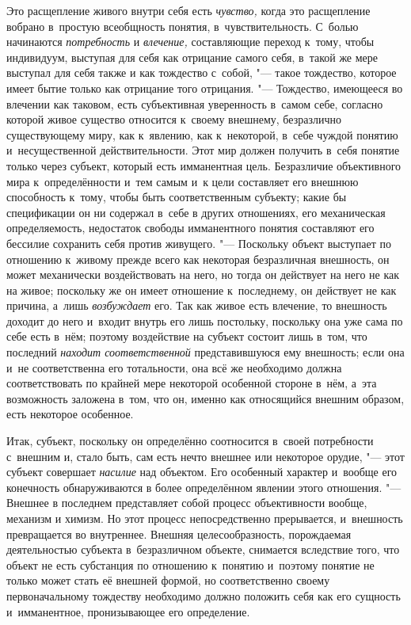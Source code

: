 Это расщепление живого внутри себя есть
{\em чувство,} когда это
расщепление вобрано в~простую всеобщность понятия, в~чувствительность.
С~болью начинаются {\em потребность}
и {\em влечение,}
составляющие переход к~тому, чтобы индивидуум, выступая для
себя как отрицание самого себя, в~такой же мере выступал для себя также и
как тождество с~собой, "--- такое тождество, которое имеет
бытие только как отрицание того отрицания. "--- Тождество,
имеющееся во влечении как таковом, есть субъективная уверенность в~самом
себе, согласно которой живое существо относится к~своему внешнему,
безразлично существующему миру, как к~явлению, как к~некоторой, в~себе
чуждой понятию и~несущественной действительности. Этот мир
должен получить в~себя понятие только через субъект, который
есть имманентная цель. Безразличие объективного мира к~определённости и~тем
самым и~к цели составляет его внешнюю способность к~тому, чтобы быть
соответственным субъекту; какие бы спецификации он ни содержал в~себе в
других отношениях, его механическая определяемость, недостаток свободы
имманентного понятия составляют его бессилие сохранить себя против
живущего. "--- Поскольку объект выступает по отношению к~живому
прежде всего как некоторая безразличная внешность, он может механически
воздействовать на него, но тогда он действует на него не как на живое;
поскольку же он имеет отношение к~последнему, он действует не как причина,
а~лишь {\em возбуждает}
его. Так как живое есть влечение, то внешность доходит до
него и~входит внутрь его лишь постольку, поскольку она уже сама по себе
есть в~нём; поэтому воздействие на субъект состоит лишь в~том, что
последний {\em находит соответственной}
представившуюся ему внешность; если она и~не соответственна
его тотальности, она всё же необходимо должна соответствовать по крайней
мере некоторой особенной стороне в~нём, а~эта возможность заложена в~том,
что он, именно как относящийся внешним образом, есть некоторое особенное.

Итак, субъект, поскольку он определённо соотносится в~своей
потребности с~внешним и, стало быть, сам есть нечто внешнее или некоторое
орудие, "--- этот субъект совершает
{\em насилие} над
объектом. Его особенный характер и~вообще его конечность обнаруживаются в
более определённом явлении этого отношения. "--- Внешнее в
последнем представляет собой процесс объективности вообще, механизм и
химизм. Но этот процесс непосредственно прерывается, и~внешность
превращается во внутреннее. Внешняя целесообразность, порождаемая
деятельностью субъекта в~безразличном объекте, снимается вследствие того,
что объект не есть субстанция по отношению к~понятию и~поэтому понятие не
только может стать её внешней формой, но соответственно своему
первоначальному тождеству необходимо должно положить себя как его сущность
и~имманентное, пронизывающее его определение.


